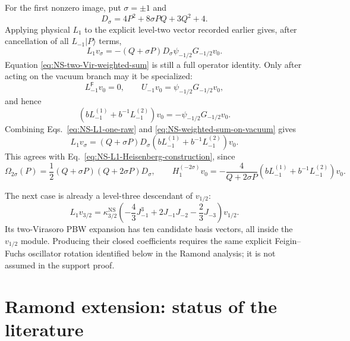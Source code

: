 \documentclass[11pt]{article}
\newcommand{\Ff}{\mathsf F}
\begin{document}
For the first nonzero image, put \(\sigma=\pm1\) and
\begin{equation}
 D_\sigma=4P^2+8\sigma PQ+3Q^2+4.
\end{equation}
Applying physical \(L_1\) to the explicit level-two vector recorded earlier
gives, after cancellation of all \(L_{-1}|P\rangle\) terms,
\begin{equation}
 L_1v_\sigma
 =-(Q+\sigma P)D_\sigma
 \psi_{-1/2}G_{-1/2}v_0.
 \label{eq:NS-L1-one-raw}
\end{equation}
Equation \eqref{eq:NS-two-Vir-weighted-sum} is still a full operator
identity.  Only after acting on the vacuum branch may it be specialized:
\begin{equation}
 L_{-1}^{\Ff}v_0=0,
 \qquad
 U_{-1}v_0=\psi_{-1/2}G_{-1/2}v_0,
\end{equation}
and hence
\begin{equation}
 \left(bL_{-1}^{(1)}+b^{-1}L_{-1}^{(2)}\right)v_0
 =-\psi_{-1/2}G_{-1/2}v_0.
 \label{eq:NS-weighted-sum-on-vacuum}
\end{equation}
Combining Eqs.~\eqref{eq:NS-L1-one-raw} and
\eqref{eq:NS-weighted-sum-on-vacuum} gives
\begin{equation}
 \boxed{
 L_1v_\sigma
 =(Q+\sigma P)D_\sigma
 \left(bL_{-1}^{(1)}+b^{-1}L_{-1}^{(2)}\right)v_0.}
 \label{eq:NS-L1-one-double-Vir}
\end{equation}
This agrees with Eq.~\eqref{eq:NS-L1-Heisenberg-construction}, since
\begin{equation}
 \Omega_{2\sigma}(P)
 =\frac12(Q+\sigma P)(Q+2\sigma P)D_\sigma,
 \qquad
 H_1^{(-2\sigma)}v_0
 =-\frac4{Q+2\sigma P}
 \left(bL_{-1}^{(1)}+b^{-1}L_{-1}^{(2)}\right)v_0.
\end{equation}

The next case is already a level-three descendant of \(v_{1/2}\):
\begin{equation}
 L_1v_{3/2}
 =\kappa_{3/2}^{\mathrm{NS}}
 \left(-\frac43J_{-1}^3+2J_{-1}J_{-2}-\frac23J_{-3}\right)v_{1/2}.
 \label{eq:NS-L1-three-halves}
\end{equation}
Its two-Virasoro PBW expansion has ten candidate basis vectors, all inside
the \(v_{1/2}\) module.  Producing their closed coefficients requires the
same explicit Feigin--Fuchs oscillator rotation identified below in the
Ramond analysis; it is not assumed in the support proof.

\section{Ramond extension: status of the literature}
\label{sec:ramond-literature-status}
\end{document}
